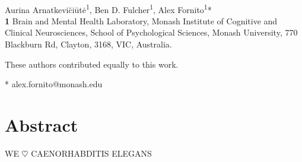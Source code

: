 \documentclass[10pt,letterpaper]{article}
\date{}
\begin{document}
\vspace*{0.2in}

\begin{flushleft}
{\Large
\textbf{} %
}
\newline
\\
Aurina Arnatkevi\u{c}i\={u}t\.{e}\textsuperscript{1\Yinyang},
Ben D. Fulcher\textsuperscript{1\Yinyang},
Alex Fornito\textsuperscript{1}*\\
\bigskip
\textbf{1} Brain and Mental Health Laboratory, Monash Institute of Cognitive and Clinical Neurosciences, School of Psychological Sciences, Monash University, 770 Blackburn Rd, Clayton, 3168, VIC, Australia.
\\
\bigskip

%
%
\Yinyang These authors contributed equally to this work.





* alex.fornito@monash.edu

\end{flushleft}
\section*{Abstract}
WE $\heartsuit$ CAENORHABDITIS ELEGANS
\end{document}
